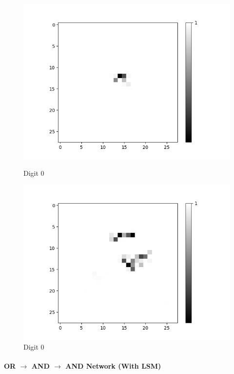 \begin{figure}[H]
\begin{minipage}[b]{0.19\textwidth}
		\includegraphics[width=\textwidth]{OR-AND(1)/Like/False/Layer0-Neuron-18.png}
		\caption{Digit 0}
		\label{fig:cnf-descrete-generalizatiion}
	\end{minipage}
	\begin{minipage}[b]{0.19\textwidth}
		\includegraphics[width=\textwidth]{OR-AND(1)/Like/False/Layer0-Neuron-19.png}
		\caption{Digit 0}
		\label{fig:cnf-descrete-generalizatiion}
	\end{minipage}
	\hfill
\end{figure}

\paragraph{OR $\rightarrow$ AND $\rightarrow$ AND Network (With LSM)}

